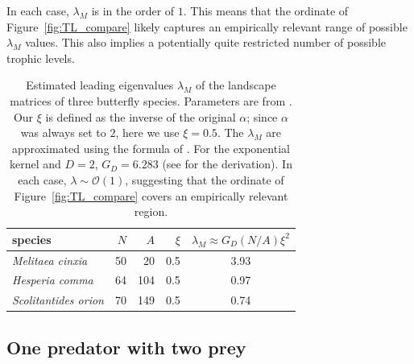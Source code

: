 \documentclass[11pt]{article}
\begin{document}
In each case, $\lambda_M$ is in the order of $1$. This means that the ordinate of  Figure~\ref{fig:TL_compare} likely captures an empirically relevant range of possible $\lambda_M$ values. This also implies a potentially quite restricted number of possible trophic levels.

\begin{table}[!ht]
  \centering
  \begin{tabular}{lrrrc}
    species & $N$ & $A$ & $\xi$ & $\lambda_M \approx G_D (N/A) \xi^2$ \\
    \hline
    \textit{Melitaea cinxia} & 50 & 20  & 0.5 & 3.93 \\
    \textit{Hesperia comma}  & 64 & 104 & 0.5 & 0.97 \\
    \textit{Scolitantides orion}  & 70 & 149 & 0.5 & 0.74 \\
  \end{tabular}
  \caption{Estimated leading eigenvalues $\lambda_M$ of the landscape matrices of three butterfly species. Parameters are from \citet[Table~2]{Hanski1994}. Our $\xi$ is defined as the inverse of the original $\alpha$; since $\alpha$ was always set to $2$, here we use $\xi = 0.5$. The $\lambda_M$ are approximated using the formula of \citet{Grillietal2015}. For the exponential kernel and $D=2$, $G_D = 6.283$ (see \citealp[Supplementary Information, Section~5]{Grillietal2015} for the derivation). In each case, $\lambda \sim \mathcal{O}(1)$, suggesting that the ordinate of Figure~\ref{fig:TL_compare} covers an empirically relevant region.}
  \label{tab:lambdaM}
\end{table}

\subsection{One predator with two prey} \label{sec:CtwoR}
\end{document}
